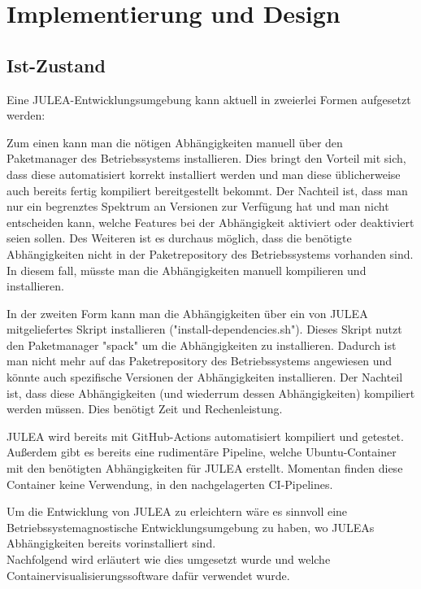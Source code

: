 \chapter{Implementierung und Design}
\label{cha:implementation_design}

\section{Ist-Zustand} \label{sec:ist-zustand}

Eine JULEA-Entwicklungsumgebung kann aktuell in zweierlei Formen aufgesetzt werden:

Zum einen kann man die nötigen Abhängigkeiten manuell über den Paketmanager des Betriebssystems installieren. Dies bringt den Vorteil mit sich, dass diese automatisiert korrekt installiert werden und man diese üblicherweise auch bereits fertig kompiliert bereitgestellt bekommt. Der Nachteil ist, dass man nur ein begrenztes Spektrum an Versionen zur Verfügung hat und man nicht entscheiden kann, welche Features bei der Abhängigkeit aktiviert oder deaktiviert seien sollen. Des Weiteren ist es durchaus möglich, dass die benötigte Abhängigkeiten nicht in der Paketrepository des Betriebssystems vorhanden sind. In diesem fall, müsste man die Abhängigkeiten manuell kompilieren und installieren. 

In der zweiten Form kann man die Abhängigkeiten über ein von JULEA mitgeliefertes Skript installieren ("install-dependencies.sh"). Dieses Skript nutzt den Paketmanager "spack" um die Abhängigkeiten zu installieren. Dadurch ist man nicht mehr auf das Paketrepository des Betriebssystems angewiesen und könnte auch spezifische Versionen der Abhängigkeiten installieren. Der Nachteil ist, dass diese Abhängigkeiten (und wiederrum dessen Abhängigkeiten) kompiliert werden müssen. Dies benötigt Zeit und Rechenleistung. 

JULEA wird bereits mit GitHub-Actions automatisiert kompiliert und getestet. Außerdem gibt es bereits eine rudimentäre Pipeline, welche Ubuntu-Container mit den benötigten Abhängigkeiten für JULEA erstellt. Momentan finden diese Container keine Verwendung, in den nachgelagerten CI-Pipelines. 

Um die Entwicklung von JULEA zu erleichtern wäre es sinnvoll eine Betriebssystemagnostische Entwicklungsumgebung zu haben, wo JULEAs Abhängigkeiten bereits vorinstalliert sind. \\
Nachfolgend wird erläutert wie dies umgesetzt wurde und welche Containervisualisierungssoftware dafür verwendet wurde.

